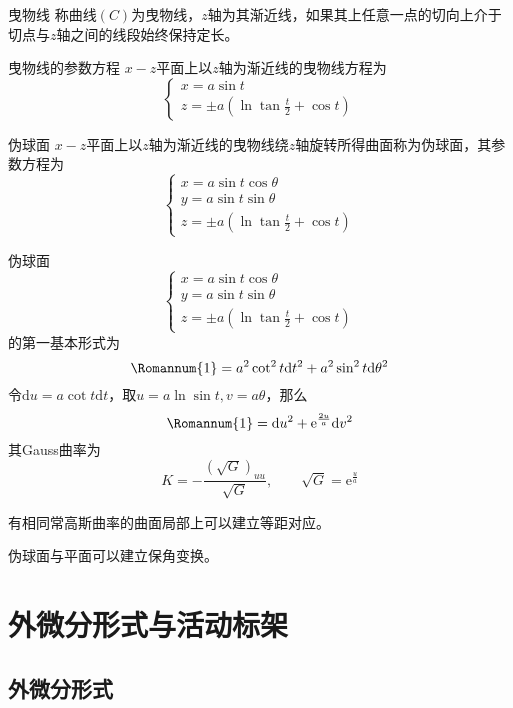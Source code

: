 \documentclass[lang = cn, scheme = chinese, thmcnt = section]{elegantbook}
\newcommand{\dd}{\mathrm{d}}           %
\begin{document}
\begin{definition}{曳物线}
	称曲线$(C)$为曳物线，$z$轴为其渐近线，如果其上任意一点的切向上介于切点与$z$轴之间的线段始终保持定长。
\end{definition}

\begin{theorem}{曳物线的参数方程}
	$x-z$平面上以$z$轴为渐近线的曳物线方程为
	$$
	\begin{cases}
		x=a\sin t\\
		z=\pm a\left(\ln\tan\frac{t}{2}+\cos t\right)
	\end{cases}
	$$
\end{theorem}

\begin{definition}{伪球面}
	$x-z$平面上以$z$轴为渐近线的曳物线绕$z$轴旋转所得曲面称为伪球面，其参数方程为%
	$$
	\begin{cases}
		x = a\sin t\cos\theta\\
		y = a\sin t\sin\theta\\
		z=\pm a\left(\ln\tan\frac{t}{2}+\cos t\right)
	\end{cases}
	$$
\end{definition}

伪球面
$$
\begin{cases}
	x = a\sin t\cos\theta\\
	y = a\sin t\sin\theta\\
	z=\pm a\left(\ln\tan\frac{t}{2}+\cos t\right)
\end{cases}
$$
的第一基本形式为
$$
{\rm\Romannum{1}}
=a^2\cot^2t\dd t^2+a^2\sin^2 t\dd\theta^2
$$
令$\dd u=a\cot t\dd t$，取$u=a\ln\sin t,v=a\theta$，那么%
$$
{\rm\Romannum{1}}
=\dd u^2+\mathrm{e}^{\frac{2u}{a}}\dd v^2
$$
其Gauss曲率为%
$$
K=-\frac{(\sqrt{G})_{uu}}{\sqrt{G}},\qquad
\sqrt{G}=\mathrm{e}^{\frac{u}{a}}
$$

\begin{theorem}
	有相同常高斯曲率的曲面局部上可以建立等距对应。
\end{theorem}

\begin{corollary}
	伪球面与平面可以建立保角变换。
\end{corollary}

\chapter{外微分形式与活动标架}

\section{外微分形式}
\end{document}
